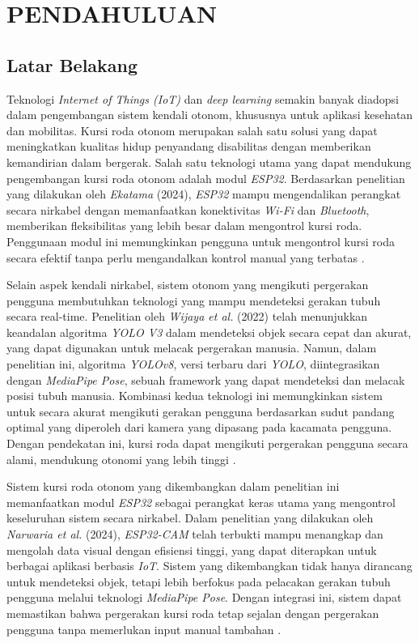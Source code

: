 \chapter{PENDAHULUAN}
\label{chap:pendahuluan}


\section{Latar Belakang}
\label{sec:latarbelakang}

Teknologi \emph{Internet of Things (IoT)} dan \emph{deep learning} semakin banyak diadopsi dalam pengembangan sistem kendali otonom, khususnya untuk aplikasi kesehatan dan mobilitas. Kursi roda otonom merupakan salah satu solusi yang dapat meningkatkan kualitas hidup penyandang disabilitas dengan memberikan kemandirian dalam bergerak. Salah satu teknologi utama yang dapat mendukung pengembangan kursi roda otonom adalah modul \emph{ESP32}. Berdasarkan penelitian yang dilakukan oleh \emph{Ekatama} (2024), \emph{ESP32} mampu mengendalikan perangkat secara nirkabel dengan memanfaatkan konektivitas \emph{Wi-Fi} dan \emph{Bluetooth}, memberikan fleksibilitas yang lebih besar dalam mengontrol kursi roda. Penggunaan modul ini memungkinkan pengguna untuk mengontrol kursi roda secara efektif tanpa perlu mengandalkan kontrol manual yang terbatas \cite{ekatama2024perancangan}.

Selain aspek kendali nirkabel, sistem otonom yang mengikuti pergerakan pengguna membutuhkan teknologi yang mampu mendeteksi gerakan tubuh secara real-time. Penelitian oleh \emph{Wijaya et al.} (2022) telah menunjukkan keandalan algoritma \emph{YOLO V3} dalam mendeteksi objek secara cepat dan akurat, yang dapat digunakan untuk melacak pergerakan manusia. Namun, dalam penelitian ini, algoritma \emph{YOLOv8}, versi terbaru dari \emph{YOLO}, diintegrasikan dengan \emph{MediaPipe Pose}, sebuah framework yang dapat mendeteksi dan melacak posisi tubuh manusia. Kombinasi kedua teknologi ini memungkinkan sistem untuk secara akurat mengikuti gerakan pengguna berdasarkan sudut pandang optimal yang diperoleh dari kamera yang dipasang pada kacamata pengguna. Dengan pendekatan ini, kursi roda dapat mengikuti pergerakan pengguna secara alami, mendukung otonomi yang lebih tinggi \cite{wijaya2022deteksi}.

Sistem kursi roda otonom yang dikembangkan dalam penelitian ini memanfaatkan modul \emph{ESP32} sebagai perangkat keras utama yang mengontrol keseluruhan sistem secara nirkabel. Dalam penelitian yang dilakukan oleh \emph{Narwaria et al.} (2024), \emph{ESP32-CAM} telah terbukti mampu menangkap dan mengolah data visual dengan efisiensi tinggi, yang dapat diterapkan untuk berbagai aplikasi berbasis \emph{IoT}. Sistem yang dikembangkan tidak hanya dirancang untuk mendeteksi objek, tetapi lebih berfokus pada pelacakan gerakan tubuh pengguna melalui teknologi \emph{MediaPipe Pose}. Dengan integrasi ini, sistem dapat memastikan bahwa pergerakan kursi roda tetap sejalan dengan pergerakan pengguna tanpa memerlukan input manual tambahan \cite{10696374}.

